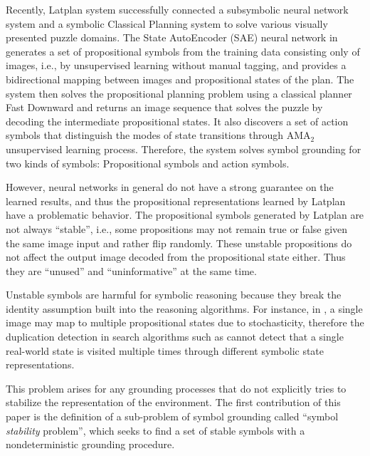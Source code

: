Recently, Latplan system \cite[]{Asai2018} successfully
connected a subsymbolic neural network system and a symbolic Classical Planning system
to solve various visually presented puzzle domains.
The State AutoEncoder (SAE) neural network in \latentplanner
generates a set of propositional symbols from the training data consisting only of images,
i.e., by unsupervised learning without manual tagging,
and provides a bidirectional mapping between images and propositional states of the plan.
% 
The system then solves the propositional planning problem using a classical planner Fast Downward \cite{Helmert04}
and returns an image sequence that solves the puzzle
by decoding the intermediate propositional states.
It also discovers a set of action symbols that distinguish the modes of
state transitions through AMA$_2$ unsupervised learning process.
Therefore, the system solves symbol grounding for two kinds of symbols:
Propositional symbols and action symbols.

However,
neural networks in general do not have a strong guarantee on the learned results,
and thus the propositional representations learned by Latplan have a problematic behavior.
The propositional symbols generated by Latplan are not always
``stable'', i.e., some propositions may not remain true or false given the same image input
and rather flip randomly.
These unstable propositions do not affect the output image decoded from the propositional state either.
Thus they are ``unused'' and ``uninformative'' at the same time.

Unstable symbols are harmful for symbolic reasoning because
they break the identity assumption built into the reasoning algorithms.
For instance, in \latentplanner, 
a single image may map to multiple propositional states due to stochasticity,
therefore the duplication detection in search algorithms such as \astar \cite{hart1968formal}
cannot detect that a single real-world state is visited multiple times through
different symbolic state representations.

This problem arises for any grounding processes that do not explicitly tries to stabilize the
representation of the environment.
The first contribution of this paper is the definition of a sub-problem of symbol grounding
called ``symbol \emph{stability} problem'', which seeks to find a set of stable symbols
with a nondeterministic grounding procedure.


